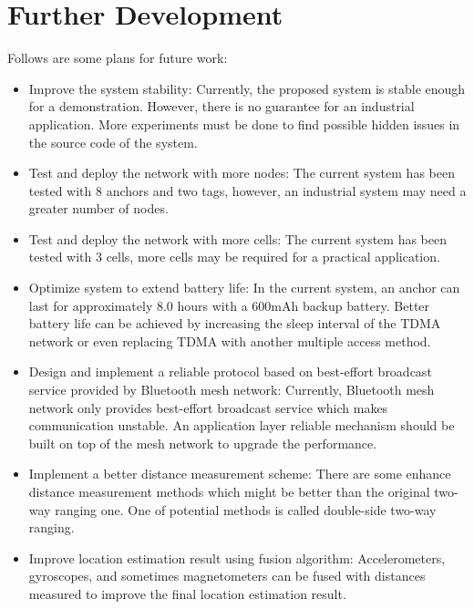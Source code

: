 \documentclass[\main/thesis.tex]{subfiles}
\begin{document}
\section{Further Development}
Follows are some plans for future work:
\begin{itemize}
    \item Improve the system stability: Currently, the proposed system is stable enough for a demonstration. However, there is no guarantee for an industrial application. More experiments must be done to find possible hidden issues in the source code of the system.
    \item Test and deploy the network with more nodes: The current system has been tested with 8 anchors and two tags, however, an industrial system may need a greater number of nodes.
    \item Test and deploy the network with more cells: The current system has been tested with 3 cells, more cells may be required for a practical application.
    \item Optimize system to extend battery life: In the current system, an anchor can last for approximately 8.0 hours with a 600mAh backup battery. Better battery life can be achieved by increasing the sleep interval of the TDMA network or even replacing TDMA with another multiple access method.
    \item Design and implement a reliable protocol based on best-effort broadcast service provided by Bluetooth mesh network: Currently, Bluetooth mesh network only provides best-effort broadcast service which makes communication unstable. An application layer reliable mechanism should be built on top of the mesh network to upgrade the performance.
    \item Implement a better distance measurement scheme: There are some enhance distance measurement methods which might be better than the original two-way ranging one. One of potential methods is called double-side two-way ranging.
    \item Improve location estimation result using fusion algorithm: Accelerometers, gyroscopes, and sometimes magnetometers can be fused with distances measured to improve the final location estimation result.
\end{itemize}
\end{document}
